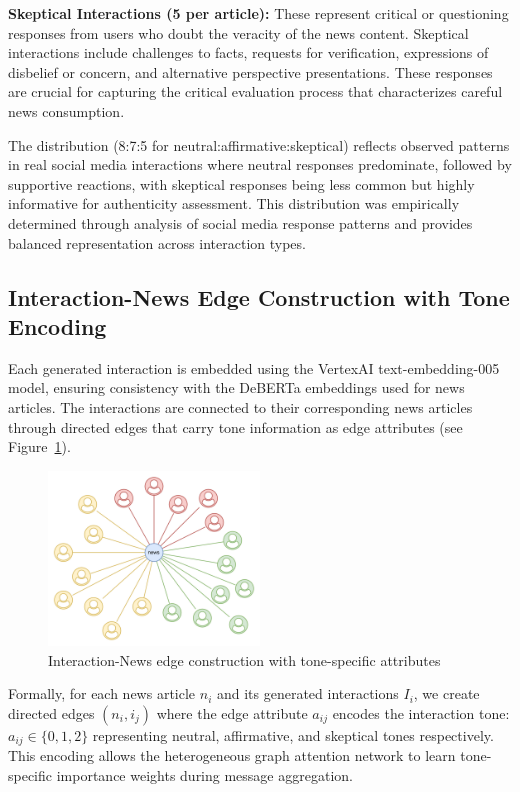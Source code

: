 \textbf{Skeptical Interactions (5 per article):} These represent critical or questioning responses from users who doubt the veracity of the news content. Skeptical interactions include challenges to facts, requests for verification, expressions of disbelief or concern, and alternative perspective presentations. These responses are crucial for capturing the critical evaluation process that characterizes careful news consumption.

The distribution (8:7:5 for neutral:affirmative:skeptical) reflects observed patterns in real social media interactions where neutral responses predominate, followed by supportive reactions, with skeptical responses being less common but highly informative for authenticity assessment. This distribution was empirically determined through analysis of social media response patterns and provides balanced representation across interaction types.

\subsection{Interaction-News Edge Construction with Tone Encoding}

Each generated interaction is embedded using the VertexAI text-embedding-005 model, ensuring consistency with the DeBERTa embeddings used for news articles. The interactions are connected to their corresponding news articles through directed edges that carry tone information as edge attributes (see Figure~\ref{fig:news_interaction_node}).

\begin{figure}[h]
    \centering
    \includegraphics[width=0.5\textwidth]{context/methodology/fig/news_interaction_node.png}
    \caption{Interaction-News edge construction with tone-specific attributes}
    \label{fig:news_interaction_node}
\end{figure}

Formally, for each news article $n_i$ and its generated interactions $I_i$, we create directed edges $(n_i, i_j)$ where the edge attribute $a_{ij}$ encodes the interaction tone: $a_{ij} \in \{0, 1, 2\}$ representing neutral, affirmative, and skeptical tones respectively. This encoding allows the heterogeneous graph attention network to learn tone-specific importance weights during message aggregation.

